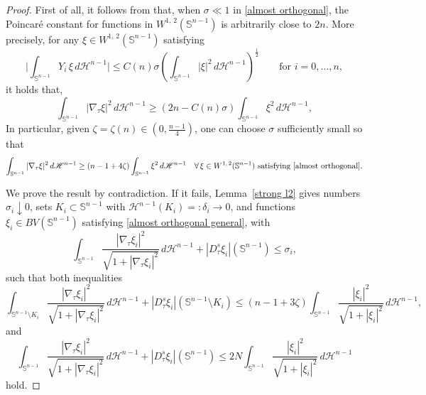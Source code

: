 \documentclass[reqno,11pt]{amsart}
\def\sz{\sigma}
\numberwithin{equation}{section}
\theoremstyle{remark}
\begin{document}
\begin{proof}
First of all, it follows from \cite[Proof of Theorem 3.1, Step 3]{F2015} that, when $\sigma \ll1 $ in \eqref{almost orthogonal}, the Poincar\'e constant for  functions in $W^{1,\,2}(\mathbb S^{n-1})$ is arbitrarily close to $2n$. More precisely,  for any $\xi \in W^{1,\,2}(\mathbb S^{n-1})$ satisfying
\begin{equation}\label{almost orthogonal}
    \biggl|\int_{\mathbb S^{n-1}} Y_i\,\xi \,d\mathscr H^{n-1}\biggr| \leq C(n)\sigma \left(\int_{\mathbb S^{n-1}}  |\xi|^2   \,d\mathscr H^{n-1}\right)^{\frac 1 2}\qquad \text{for }i=0,\ldots,n,
\end{equation}
it holds that,
$$\int_{\mathbb S^{n-1}} {|\nabla_\tau \xi|^2} \,d\mathscr H^{n-1}\geq \left(2n-C(n)\sz\right) \int_{\mathbb S^{n-1}} \xi^2 \,d\mathscr H^{n-1},    $$
In particular, given $\zeta=\zeta(n) \in \left(0,\frac{n-1}{4}\right)$,  one can choose $\sigma$ sufficiently small so that
\begin{equation} \label{sharp Poincare}
\int_{\mathbb S^{n-1}} {|\nabla_\tau \xi|^2} \,d\mathscr H^{n-1}\geq  (n-1+4\zeta) \int_{\mathbb S^{n-1}} \xi^2 \,d\mathscr H^{n-1} \quad  \forall\, \xi \in W^{1,\,2}(\mathbb S^{n-1}) \text{ satisfying \eqref{almost orthogonal}}.
\end{equation}

We prove the result by contradiction. If it fails,  Lemma~\ref{strong l2} gives numbers $\sigma_i\downarrow0$,
sets $K_i\subset\mathbb S^{n-1}$ with
$\mathscr H^{n-1}(K_i)=:\delta_i\to0$, and functions
$\xi_i\in BV(\mathbb S^{n-1})$ satisfying \eqref{almost orthogonal general},
with
\[
\int_{\mathbb S^{n-1}}  \frac{|\nabla_\tau  \xi_i|^2}{\sqrt{1+ |\nabla_\tau \xi_i|^2}} \,d\mathscr H^{n-1}
+|D^s_\tau\xi_i|(\mathbb S^{n-1})\le\sigma_i,
\]
such that both inequalities
\begin{equation} \label{contradiction1}
\int_{\mathbb S^{n-1}\setminus K_i}  \frac{|\nabla_\tau  \xi_i|^2}{\sqrt{1+ |\nabla_\tau \xi_i|^2}} \,d\mathscr H^{n-1}
+|D^s_\tau\xi_i|(\mathbb S^{n-1}\setminus K_i)
\le  \left(n-1+ 3 \zeta\right)  \int_{\mathbb S^{n-1}} \frac{|\xi_i|^2}{\sqrt{1+ |\xi_i|^2}} \,d\mathscr H^{n-1}, \end{equation}
and
\begin{equation} \label{contradiction2}
\int_{\mathbb S^{n-1}}  \frac{|\nabla_\tau  \xi_i|^2}{\sqrt{1+ |\nabla_\tau \xi_i|^2}} \,d\mathscr H^{n-1}
+|D^s_\tau\xi_i|(\mathbb S^{n-1})
\leq 2N  \int_{\mathbb S^{n-1}} \frac{|\xi_i|^2}{\sqrt{1+ |\xi_i|^2}} \,d\mathscr H^{n-1}
\end{equation}
hold.


\end{proof}
\end{document}
